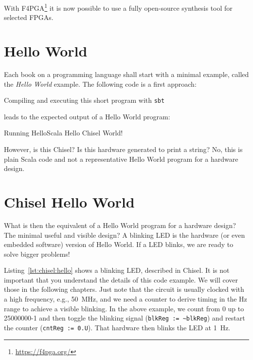 \documentclass[%
    10pt,
    headinclude, footexclude,
    openright, %
    notitlepage,
    cleardoubleempty,
    headsepline,
    pointlessnumbers,
    bibtotoc, idxtotoc,
    ]{scrbook}
\newcommand{\code}[1]{{\lstinline[basicstyle=\small\ttfamily]{#1}}}
\newcommand{\myref}[2]{\href{#1}{#2}}
\renewcommand{\myref}[2]{{#2}{\footnote{\url{#1}}}}
\begin{document}
With \myref{https://f4pga.org/}{F4PGA} it is now possible to use a fully open-source synthesis tool
for selected FPGAs.

\section{Hello World}

Each book on a programming language shall start with a minimal example,
called the \emph{Hello World} example. The following code is a first approach:




\noindent Compiling and executing this short program with \code{sbt}


\noindent leads to the expected output of a Hello World program:

\begin{chisel}
[info] Running HelloScala
Hello Chisel World!
\end{chisel}

\noindent However, is this Chisel? Is this hardware generated to print a string?
No, this is plain Scala code and not a representative Hello World
program for a hardware design.

\section{Chisel Hello World}

What is then the equivalent of a Hello World program for a hardware design?
The minimal useful and visible design? A blinking LED is the hardware (or even
embedded software) version of Hello World. If a LED blinks, we are ready to
solve bigger problems!


Listing~\ref{lst:chisel:hello} shows a blinking LED, described in Chisel.
It is not important that you understand the details of this code example.
We will cover those in the following chapters. Just note that the circuit is
usually clocked with a high frequency, e.g., 50~MHz, and we need a counter
to derive timing in the Hz range to achieve a visible blinking. In the above
example, we count from 0 up to 25000000-1 and then toggle the blinking signal
(\code{blkReg := ~blkReg}) and restart the counter (\code{cntReg := 0.U}).
That hardware then blinks the LED at 1~Hz.
\end{document}

